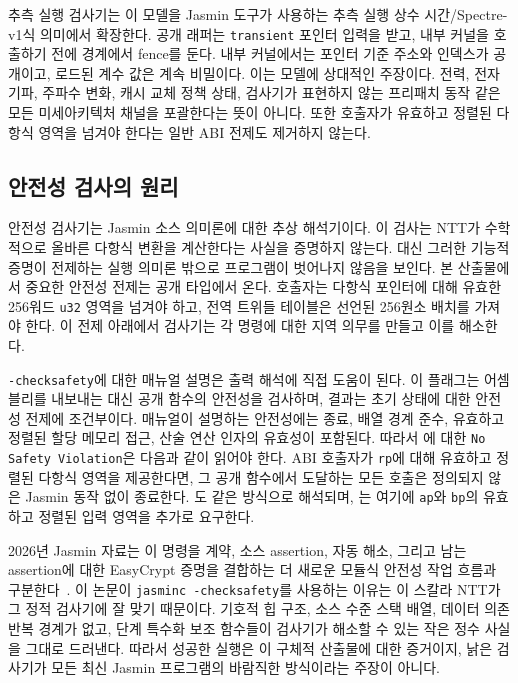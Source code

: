 \documentclass[10pt,twocolumn]{article}
\newcommand{\jasmin}{Jasmin}
\newcommand{\sct}{추측 실행 상수 시간}
\begin{document}
추측 실행 검사기는 이 모델을 \jasmin{} 도구가 사용하는
\sct{}/Spectre-v1식 의미에서 확장한다. 공개 래퍼는 \texttt{transient} 포인터
입력을 받고, 내부 커널을 호출하기 전에 경계에서 fence를 둔다. 내부
커널에서는 포인터 기준 주소와 인덱스가 공개이고, 로드된 계수 값은 계속
비밀이다. 이는 모델에 상대적인 주장이다. 전력, 전자기파, 주파수 변화,
캐시 교체 정책 상태, 검사기가 표현하지 않는 프리패치 동작 같은 모든
미세아키텍처 채널을 포괄한다는 뜻이 아니다. 또한 호출자가 유효하고
정렬된 다항식 영역을 넘겨야 한다는 일반 ABI 전제도 제거하지 않는다.

\subsection{안전성 검사의 원리}

안전성 검사기는 \jasmin{} 소스 의미론에 대한 추상 해석기이다. 이
검사는 NTT가 수학적으로 올바른 다항식 변환을 계산한다는 사실을
증명하지 않는다. 대신 그러한 기능적 증명이 전제하는 실행 의미론
밖으로 프로그램이 벗어나지 않음을 보인다. 본 산출물에서 중요한
안전성 전제는 공개 타입에서 온다. 호출자는 다항식 포인터에 대해
유효한 256워드 \texttt{u32} 영역을 넘겨야 하고, 전역 트위들 테이블은
선언된 256원소 배치를 가져야 한다. 이 전제 아래에서 검사기는 각 명령에
대한 지역 의무를 만들고 이를 해소한다.

\texttt{-checksafety}에 대한 매뉴얼 설명은 출력 해석에 직접 도움이
된다. 이 플래그는 어셈블리를 내보내는 대신 공개 함수의 안전성을
검사하며, 결과는 초기 상태에 대한 안전성 전제에 조건부이다. 매뉴얼이
설명하는 안전성에는 종료, 배열 경계 준수, 유효하고 정렬된 할당 메모리
접근, 산술 연산 인자의 유효성이 포함된다. 따라서
에 대한 \texttt{No Safety Violation}은 다음과 같이
읽어야 한다. ABI 호출자가 \texttt{rp}에 대해 유효하고 정렬된 다항식
영역을 제공한다면, 그 공개 함수에서 도달하는 모든 호출은 정의되지 않은
\jasmin{} 동작 없이 종료한다. 도 같은 방식으로
해석되며, 는 여기에 \texttt{ap}와 \texttt{bp}의
유효하고 정렬된 입력 영역을 추가로 요구한다.

2026년 \jasmin{} 자료는 이 명령을 계약, 소스 assertion, 자동 해소,
그리고 남는 assertion에 대한 EasyCrypt 증명을 결합하는 더 새로운
모듈식 안전성 작업 흐름과 구분한다~\cite{JasminFramework2026}. 이 논문이
\texttt{jasminc -checksafety}를 사용하는 이유는 이 스칼라 NTT가 그
정적 검사기에 잘 맞기 때문이다. 기호적 힙 구조, 소스 수준 스택 배열,
데이터 의존 반복 경계가 없고, 단계 특수화 보조 함수들이 검사기가 해소할
수 있는 작은 정수 사실을 그대로 드러낸다. 따라서 성공한 실행은 이
구체적 산출물에 대한 증거이지, 낡은 검사기가 모든 최신 \jasmin{}
프로그램의 바람직한 방식이라는 주장이 아니다.
\end{document}
